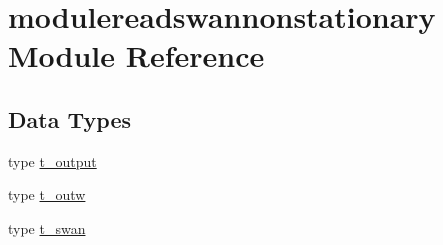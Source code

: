 \hypertarget{namespacemodulereadswannonstationary}{}\section{modulereadswannonstationary Module Reference}
\label{namespacemodulereadswannonstationary}
\subsection*{Data Types}
\begin{DoxyCompactItemize}
\item 
type \mbox{\hyperlink{structmodulereadswannonstationary_1_1t__output}{t\+\_\+output}}
\item 
type \mbox{\hyperlink{structmodulereadswannonstationary_1_1t__outw}{t\+\_\+outw}}
\item 
type \mbox{\hyperlink{structmodulereadswannonstationary_1_1t__swan}{t\+\_\+swan}}
\end{DoxyCompactItemize}
